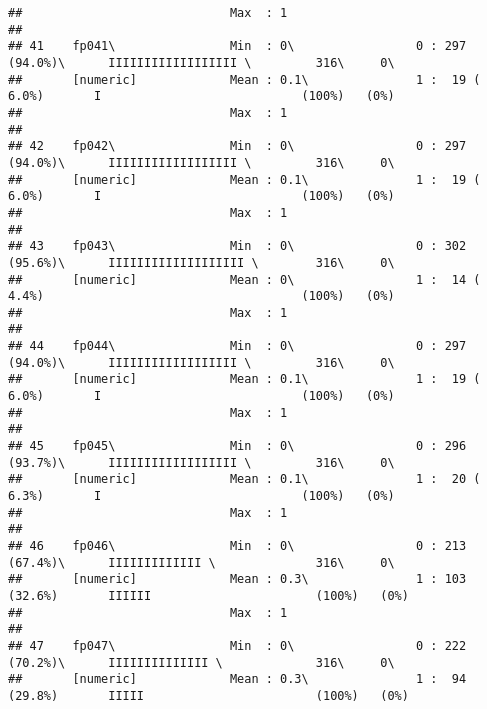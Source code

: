 \documentclass[]{article}
\begin{document}
\begin{verbatim}
##                             Max  : 1                                                                                       
## 
## 41    fp041\                Min  : 0\                 0 : 297 (94.0%)\      IIIIIIIIIIIIIIIIII \         316\     0\       
##       [numeric]             Mean : 0.1\               1 :  19 ( 6.0%)       I                            (100%)   (0%)     
##                             Max  : 1                                                                                       
## 
## 42    fp042\                Min  : 0\                 0 : 297 (94.0%)\      IIIIIIIIIIIIIIIIII \         316\     0\       
##       [numeric]             Mean : 0.1\               1 :  19 ( 6.0%)       I                            (100%)   (0%)     
##                             Max  : 1                                                                                       
## 
## 43    fp043\                Min  : 0\                 0 : 302 (95.6%)\      IIIIIIIIIIIIIIIIIII \        316\     0\       
##       [numeric]             Mean : 0\                 1 :  14 ( 4.4%)                                    (100%)   (0%)     
##                             Max  : 1                                                                                       
## 
## 44    fp044\                Min  : 0\                 0 : 297 (94.0%)\      IIIIIIIIIIIIIIIIII \         316\     0\       
##       [numeric]             Mean : 0.1\               1 :  19 ( 6.0%)       I                            (100%)   (0%)     
##                             Max  : 1                                                                                       
## 
## 45    fp045\                Min  : 0\                 0 : 296 (93.7%)\      IIIIIIIIIIIIIIIIII \         316\     0\       
##       [numeric]             Mean : 0.1\               1 :  20 ( 6.3%)       I                            (100%)   (0%)     
##                             Max  : 1                                                                                       
## 
## 46    fp046\                Min  : 0\                 0 : 213 (67.4%)\      IIIIIIIIIIIII \              316\     0\       
##       [numeric]             Mean : 0.3\               1 : 103 (32.6%)       IIIIII                       (100%)   (0%)     
##                             Max  : 1                                                                                       
## 
## 47    fp047\                Min  : 0\                 0 : 222 (70.2%)\      IIIIIIIIIIIIII \             316\     0\       
##       [numeric]             Mean : 0.3\               1 :  94 (29.8%)       IIIII                        (100%)   (0%)     

\end{verbatim}
\end{document}
